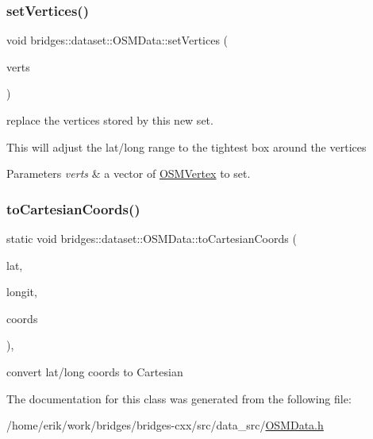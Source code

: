\subsubsection{\texorpdfstring{set\+Vertices()}{setVertices()}}
{\footnotesize\ttfamily void bridges\+::dataset\+::\+O\+S\+M\+Data\+::set\+Vertices (\begin{DoxyParamCaption}\item[{const vector$<$ \hyperlink{classbridges_1_1dataset_1_1_o_s_m_vertex}{O\+S\+M\+Vertex} $>$ \&}]{verts }\end{DoxyParamCaption})\hspace{0.3cm}{\ttfamily [inline]}}



replace the vertices stored by this new set. 

This will adjust the lat/long range to the tightest box around the vertices


\begin{DoxyParams}{Parameters}
{\em verts} & a vector of \hyperlink{classbridges_1_1dataset_1_1_o_s_m_vertex}{O\+S\+M\+Vertex} to set. \\
\hline
\end{DoxyParams}
\mbox{\label{classbridges_1_1dataset_1_1_o_s_m_data_a519483237352f16f0405137138ee2bd1}} 
\subsubsection{\texorpdfstring{to\+Cartesian\+Coords()}{toCartesianCoords()}}
{\footnotesize\ttfamily static void bridges\+::dataset\+::\+O\+S\+M\+Data\+::to\+Cartesian\+Coords (\begin{DoxyParamCaption}\item[{double}]{lat,  }\item[{double}]{longit,  }\item[{double $\ast$}]{coords }\end{DoxyParamCaption})\hspace{0.3cm}{\ttfamily [inline]}, {\ttfamily [static]}}

convert lat/long coords to Cartesian 

The documentation for this class was generated from the following file\+:\begin{DoxyCompactItemize}
\item 
/home/erik/work/bridges/bridges-\/cxx/src/data\+\_\+src/\hyperlink{_o_s_m_data_8h}{O\+S\+M\+Data.\+h}\end{DoxyCompactItemize}
